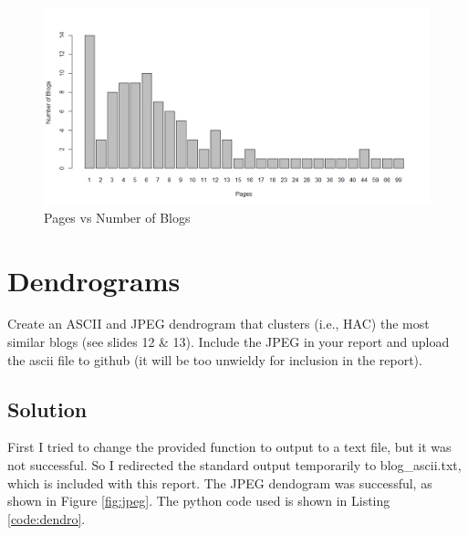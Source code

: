 \documentclass[paper=a4, fontsize=11pt]{scrartcl} %
\numberwithin{equation}{section} %
\numberwithin{figure}{section} %
\numberwithin{table}{section} %
\begin{document}
\begin{figure}[H]
\includegraphics[width=1.2\textwidth]{hist}
\caption{Pages vs Number of Blogs}
\label{fig:hist}
\end{figure}




\section{Dendrograms}
Create an ASCII and JPEG dendrogram that clusters (i.e., HAC) the most similar blogs (see slides 12 \& 13).  
Include the JPEG in your report and upload the ascii file to github (it will be too unwieldy for inclusion in the report).

\subsection{Solution}
First I tried to change the provided function to output to a text file, but it was not successful.
So I redirected the standard output temporarily to blog\_ascii.txt, which is included with this report. \cite{bib:pystdout}
The JPEG dendogram was successful, as shown in Figure \ref{fig:jpeg}.  
The python code used is shown in Listing \ref{code:dendro}.\\


\end{document}
